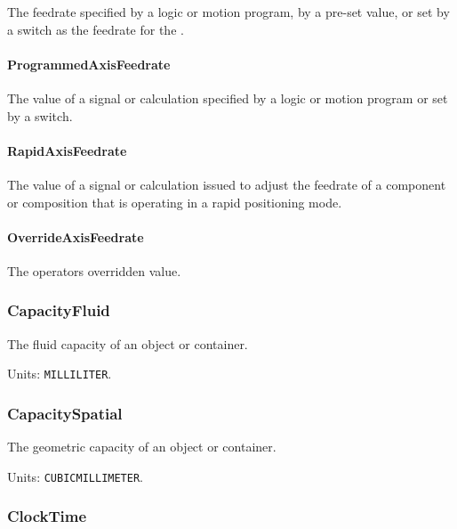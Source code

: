 The feedrate specified by a logic or motion program, by a pre-set value, or set by a switch as the feedrate for the . 


\paragraph{ProgrammedAxisFeedrate}\mbox{}
\label{sec:ProgrammedAxisFeedrate}


The value of a signal or calculation specified by a logic or motion program or set by a switch.


\paragraph{RapidAxisFeedrate}\mbox{}
\label{sec:RapidAxisFeedrate}


The value of a signal or calculation issued to adjust the feedrate of a component or composition that is operating in a rapid positioning mode.


\paragraph{OverrideAxisFeedrate}\mbox{}
\label{sec:OverrideAxisFeedrate}


The operators overridden value.


\subsubsection{CapacityFluid}
\label{sec:CapacityFluid}



The fluid capacity of an object or container.


Units: \texttt{MILLILITER}.

\subsubsection{CapacitySpatial}
\label{sec:CapacitySpatial}



The geometric capacity of an object or container.


Units: \texttt{CUBIC\textunderscore MILLIMETER}.

\subsubsection{ClockTime}
\label{sec:ClockTime}



